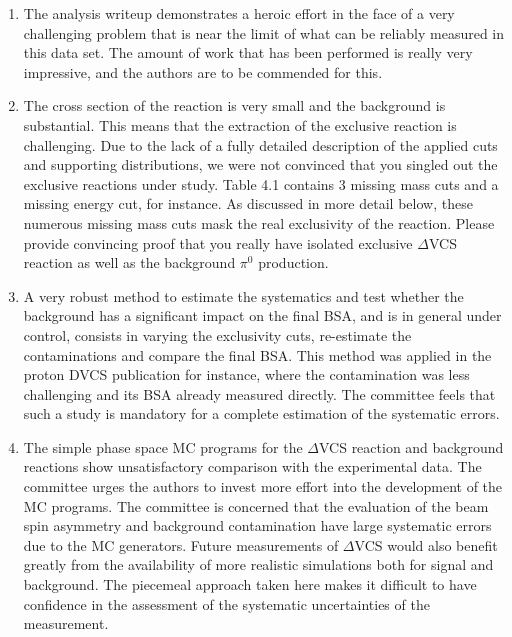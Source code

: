 \documentclass[11pt]{paper}
\begin{document}
\begin{enumerate}

\item The analysis writeup demonstrates a heroic effort in the face of a very challenging problem that is near the limit of what can be reliably measured in this data set. The amount of work that has been performed is really very impressive, and the authors are to be commended for this. 

\item The cross section of the reaction is very small and the background is substantial. 
This means that the extraction of the exclusive reaction is challenging. 
Due to the lack of a fully detailed description of the applied cuts and supporting distributions, we were not convinced that you singled out the exclusive reactions under study. 
Table 4.1 contains 3 missing mass cuts and a missing energy cut, for instance. As discussed in more detail below, these numerous missing mass cuts mask the real exclusivity of the reaction. 
Please provide convincing proof that you really have isolated exclusive $\Delta$VCS reaction as well as the background $\pi^0$ production.
 
\item A very robust method to estimate the systematics and test whether the background has a significant impact on the final BSA, and is in general under control, consists in
varying the exclusivity cuts, re-estimate the contaminations and compare the final BSA.
This method was applied in the proton DVCS publication for instance, where the contamination was less challenging and its BSA already measured directly.
The committee feels that such a study is mandatory for a complete estimation of the systematic errors.

\item The simple phase space MC programs for the $\Delta$VCS reaction and background reactions show unsatisfactory comparison with the experimental data. 
The committee urges the authors to invest more effort into the development of the MC programs.  
The committee is concerned that the evaluation of the beam spin asymmetry and background contamination have large systematic errors due to the MC generators. 
Future measurements of $\Delta$VCS would also benefit greatly from the availability of more realistic simulations both for signal and background. The piecemeal approach taken here makes it difficult to have confidence in the assessment of the systematic uncertainties of the measurement.


\end{enumerate}
\end{document}
